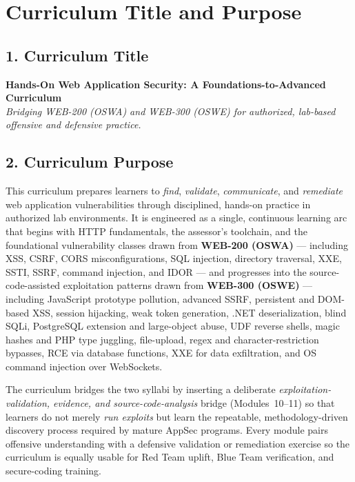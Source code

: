 \documentclass[11pt,letterpaper,oneside]{report}
\begin{document}
\tableofcontents
\clearpage
{}
\setcounter{page}{1}

\chapter*{Curriculum Title and Purpose}

\section*{1. Curriculum Title}
\textbf{\large Hands-On Web Application Security: A Foundations-to-Advanced Curriculum} \\
\textit{Bridging WEB-200 (OSWA) and WEB-300 (OSWE) for authorized, lab-based offensive and defensive practice.}

\section*{2. Curriculum Purpose}
This curriculum prepares learners to \emph{find}, \emph{validate}, \emph{communicate}, and \emph{remediate} web application vulnerabilities through disciplined, hands-on practice in authorized lab environments. It is engineered as a single, continuous learning arc that begins with HTTP fundamentals, the assessor's toolchain, and the foundational vulnerability classes drawn from \textbf{WEB-200 (OSWA)} --- including XSS, CSRF, CORS misconfigurations, SQL injection, directory traversal, XXE, SSTI, SSRF, command injection, and IDOR --- and progresses into the source-code-assisted exploitation patterns drawn from \textbf{WEB-300 (OSWE)} --- including JavaScript prototype pollution, advanced SSRF, persistent and DOM-based XSS, session hijacking, weak token generation, .NET deserialization, blind SQLi, PostgreSQL extension and large-object abuse, UDF reverse shells, magic hashes and PHP type juggling, file-upload, regex and character-restriction bypasses, RCE via database functions, XXE for data exfiltration, and OS command injection over WebSockets.

The curriculum bridges the two syllabi by inserting a deliberate \emph{exploitation-validation, evidence, and source-code-analysis} bridge (Modules~10--11) so that learners do not merely \emph{run exploits} but learn the repeatable, methodology-driven discovery process required by mature AppSec programs. Every module pairs offensive understanding with a defensive validation or remediation exercise so the curriculum is equally usable for Red Team uplift, Blue Team verification, and secure-coding training.
\end{document}
